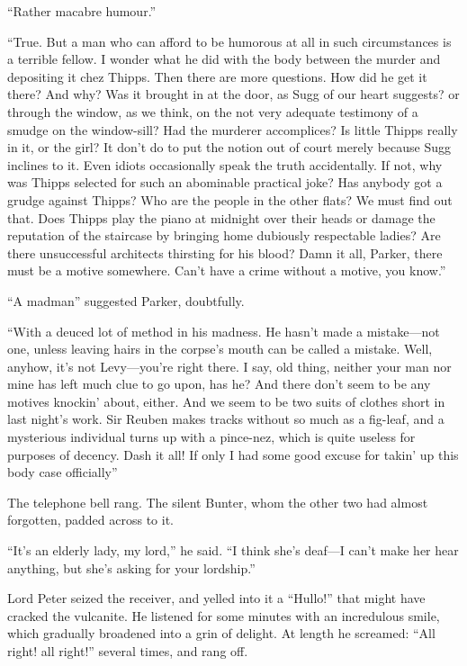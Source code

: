 \enquote{Rather macabre humour.}

\enquote{True. But a man who can afford to be humorous at all in such circumstances is a terrible fellow. I wonder what he did with the body between the murder and depositing it chez Thipps. Then there are more questions. How did he get it there? And why? Was it brought in at the door, as Sugg of our heart suggests? or through the window, as we think, on the not very adequate testimony of a smudge on the window-sill? Had the murderer accomplices? Is little Thipps really in it, or the girl? It don’t do to put the notion out of court merely because Sugg inclines to it. Even idiots occasionally speak the truth accidentally. If not, why was Thipps selected for such an abominable practical joke? Has anybody got a grudge against Thipps? Who are the people in the other flats? We must find out that. Does Thipps play the piano at midnight over their heads or damage the reputation of the staircase by bringing home dubiously respectable ladies? Are there unsuccessful architects thirsting for his blood? Damn it all, Parker, there must be a motive somewhere. Can’t have a crime without a motive, you know.}

\enquote{A madman\longdash} suggested Parker, doubtfully.

\enquote{With a deuced lot of method in his madness. He hasn’t made a mistake\allowbreak---\allowbreak not one, unless leaving hairs in the corpse’s mouth can be called a mistake. Well, anyhow, it’s not Levy\allowbreak---\allowbreak you’re right there. I say, old thing, neither your man nor mine has left much clue to go upon, has he? And there don’t seem to be any motives knockin’ about, either. And we seem to be two suits of clothes short in last night’s work. Sir Reuben makes tracks without so much as a fig-leaf, and a mysterious individual turns up with a pince-nez, which is quite useless for purposes of decency. Dash it all! If only I had some good excuse for takin’ up this body case officially\longdash}

The telephone bell rang. The silent Bunter, whom the other two had almost forgotten, padded across to it.

\enquote{It’s an elderly lady, my lord,} he said. \enquote{I think she’s deaf\allowbreak---\allowbreak I can’t make her hear anything, but she’s asking for your lordship.}

Lord Peter seized the receiver, and yelled into it a \enquote{Hullo!} that might have cracked the vulcanite. He listened for some minutes with an incredulous smile, which gradually broadened into a grin of delight. At length he screamed: \enquote{All right! all right!} several times, and rang off.

